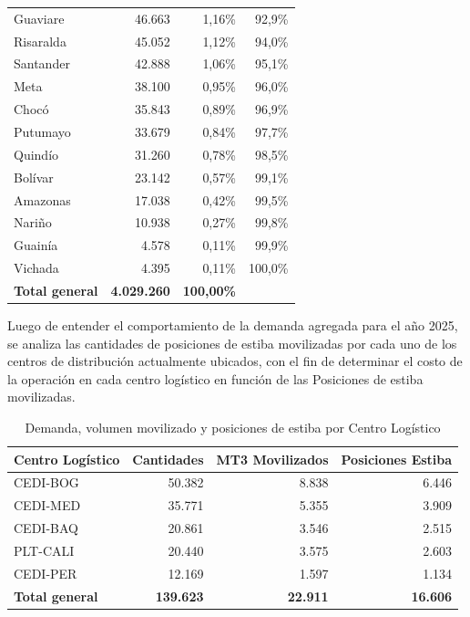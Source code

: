 \documentclass[fleqn, 11pt,letterpaper]{article}
\begin{document}
\begin{table}[H]
\begin{tabular}{lrrr}
Guaviare           &  46.663 &  1,16\% & 92,9\%  \\
Risaralda          &  45.052 &  1,12\% & 94,0\%  \\
Santander          &  42.888 &  1,06\% & 95,1\%  \\
Meta               &  38.100 &  0,95\% & 96,0\%  \\
Chocó              &  35.843 &  0,89\% & 96,9\%  \\
Putumayo           &  33.679 &  0,84\% & 97,7\%  \\
Quindío            &  31.260 &  0,78\% & 98,5\%  \\
Bolívar            &  23.142 &  0,57\% & 99,1\%  \\
Amazonas           &  17.038 &  0,42\% & 99,5\%  \\
Nariño             &  10.938 &  0,27\% & 99,8\%  \\
Guainía            &   4.578 &  0,11\% & 99,9\%  \\
Vichada            &   4.395 &  0,11\% & 100,0\% \\
\midrule
\textbf{Total general} & \textbf{4.029.260} & \textbf{100,00\%} & \\
\bottomrule
\end{tabular}
\end{table}
Luego de entender el comportamiento de la demanda agregada para el año 2025, se analiza las cantidades de posiciones de estiba movilizadas por cada uno de los centros de distribución actualmente ubicados, con el fin de determinar el costo de la operación en cada centro logístico en función de las Posiciones de estiba movilizadas.


\begin{table}[H]
\centering
\caption{Demanda, volumen movilizado y posiciones de estiba por Centro Logístico}
\label{tab:demanda_nodos}
\begin{tabular}{lrrr}
\toprule
\textbf{Centro Logístico} & \textbf{Cantidades} & \textbf{MT3 Movilizados} & \textbf{Posiciones Estiba} \\
\midrule
CEDI-BOG      & 50.382  & 8.838  & 6.446  \\
CEDI-MED      & 35.771  & 5.355  & 3.909  \\
CEDI-BAQ      & 20.861  & 3.546  & 2.515  \\
PLT-CALI      & 20.440  & 3.575  & 2.603  \\
CEDI-PER      & 12.169  & 1.597  & 1.134  \\
\midrule
\textbf{Total general} & \textbf{139.623} & \textbf{22.911} & \textbf{16.606} \\
\bottomrule
\end{tabular}
\end{table}
\end{document}
